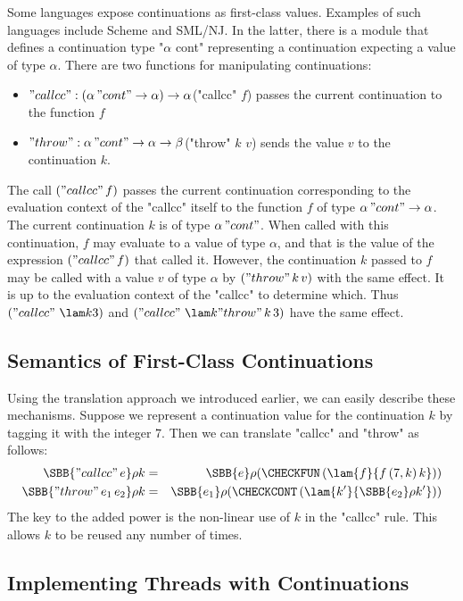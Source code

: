 Some languages expose continuations as first-class values. Examples of
such languages include Scheme and SML/NJ. In the latter, there is
a module that defines a continuation type "$\alpha$ cont" representing a continuation
expecting a value of type $\alpha$. There are two functions for manipulating
continuations:
\begin{itemize}
\item
$"callcc" : (\alpha\,"cont" \to\alpha)\to\alpha$\quad("callcc" $f$) passes the current continuation to the function $f$
\item
$"throw" : \alpha\,"cont" \to \alpha \to \beta$\quad("throw" $k$ $v$) sends the value $v$ to the continuation $k$.
\end{itemize}
The call $("callcc"\,f)$ passes the current continuation corresponding to the
evaluation context of the "callcc" itself to the function $f$ of type $\alpha\,"cont" \to \alpha$.
The current continuation $k$ is of type $\alpha\,"cont"$.
When called with this continuation, $f$ may evaluate to a value of type $\alpha$,
and that is the value of the expression $("callcc"\,f)$ that called it.
However, the continuation $k$ passed to $f$ may be called with a value $v$ of type $\alpha$
by $("throw"\,k\,v)$ with the same effect.
It is up to the evaluation context of the "callcc" to determine which.
Thus $("callcc"\ \lam k3)$ and $("callcc"\ \lam k{"throw"\,k\,3})$ have the same effect.

\subsection{Semantics of First-Class Continuations}

Using the translation approach we introduced earlier, we can easily
describe these mechanisms. Suppose we represent a continuation value
for the continuation $k$ by tagging it with the integer 7. Then we
can translate "callcc" and "throw" as follows:
\begin{eqnarray*}
\SBB{"callcc"\,e}\rho k &=& \SBB{e}\rho(\CHECKFUN\,(\lam{f}{f\,(7,k)\,k})) \\
\SBB{"throw"\,e_1\,e_2}\rho k &=& \SBB{e_1}\rho{(\CHECKCONT\,(\lam{k'}{\SBB{e_2}\rho{k'}}))}
\end{eqnarray*}
The key to the added power is the non-linear use of $k$ in the "callcc" rule.
This allows $k$ to be reused any number of times.

\subsection{Implementing Threads with Continuations}

